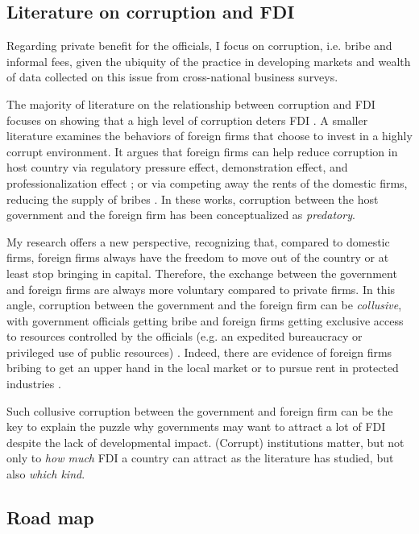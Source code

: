 \subsection{Literature on corruption and FDI}

Regarding private benefit for the officials, I focus on corruption, i.e. bribe and informal fees, given the ubiquity of the practice in developing markets and wealth of data collected on this issue from cross-national business surveys. 

The majority of literature on the relationship between corruption and FDI focuses on showing that a high level of corruption deters FDI \citep{Wei2000, Hakkala2008, Al-Sadig2009}. A smaller literature examines the behaviors of foreign firms that choose to invest in a highly corrupt environment. It argues that foreign firms can help reduce corruption in host country via regulatory pressure effect, demonstration effect, and professionalization effect \citep{Kwok2006}; or via competing away the rents of the domestic firms, reducing the supply of bribes \citep{Sandholtz2003}. In these works, corruption between the host government and the foreign firm has been conceptualized as \textit{predatory}.

My research offers a new perspective, recognizing that, compared to domestic firms, foreign firms always have the freedom to move out of the country or at least stop bringing in capital. Therefore, the exchange between the government and foreign firms are always more voluntary compared to private firms. In this angle, corruption between the government and the foreign firm can be \textit{collusive}, with government officials getting bribe and foreign firms getting exclusive access to resources controlled by the officials (e.g. an expedited bureaucracy or privileged use of public resources) \citep{Hellman2002}. Indeed, there are evidence of foreign firms bribing to get an upper hand in the local market \citep{Barstow2012} or to pursue rent in protected industries \citep{Malesky2015}. 

Such collusive corruption between the government and foreign firm can be the key to explain the puzzle why governments may want to attract a lot of FDI despite the lack of developmental impact. (Corrupt) institutions matter, but not only to \textit{how much} FDI a country can attract as the literature has studied, but also \textit{which kind}.


\subsection{Road map}

